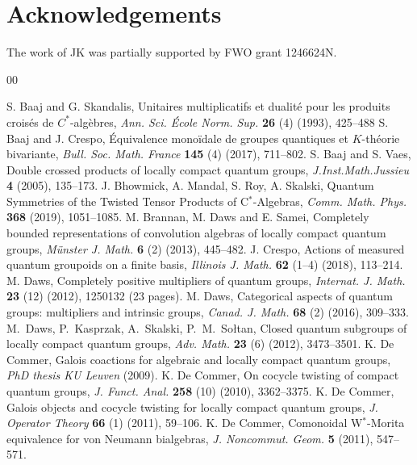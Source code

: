 \documentclass[reqno]{amsart}
\numberwithin{equation}{section}
\begin{document}
\section{Acknowledgements}
The work of JK was partially supported by FWO grant 1246624N.

\begin{thebibliography}{00}

 S. Baaj and G. Skandalis, Unitaires multiplicatifs et dualit\'e{} pour les produits
              crois\'es de {$C^*$}-alg\`ebres, \emph{Ann. Sci. \'Ecole Norm. Sup.} \textbf{26} (4) (1993), 425--488
 S. Baaj and J. Crespo, \'{E}quivalence mono\"{i}dale de groupes quantiques et $K$-théorie bivariante, \emph{Bull. Soc. Math. France} \textbf{145} (4) (2017), 711--802.
 S. Baaj and S. Vaes, Double crossed products of locally compact quantum groups, \emph{J.Inst.Math.Jussieu} \textbf{4} (2005), 135--173.
 J. Bhowmick, A. Mandal, S. Roy, A. Skalski, Quantum Symmetries of the Twisted Tensor Products of C$^*$-Algebras, \emph{Comm. Math. Phys.} \textbf{368} (2019), 1051--1085.
 M. Brannan, M. Daws and E. Samei, Completely bounded representations of convolution algebras of locally compact quantum groups, \emph{M{\"u}nster J. Math.} \textbf{6} (2) (2013), 445--482.
 J. Crespo, Actions of measured quantum groupoids on a finite basis, \emph{Illinois J. Math.} \textbf{62} (1--4) (2018),  113--214.
 M. Daws, Completely positive multipliers of quantum groups, \emph{Internat. J. Math.} \textbf{23} (12) (2012), 1250132 (23 pages).
 M. Daws, Categorical aspects of quantum groups: multipliers and intrinsic groups, \emph{Canad. J. Math.} \textbf{68} (2) (2016), 309--333.
 M.\ Daws, P.\ Kasprzak, A.\ Skalski, P.\ M.\ So\l tan, Closed quantum subgroups of locally compact quantum groups, \emph{Adv. Math.} \textbf{23} (6) (2012),  3473--3501.
 K. De Commer, Galois coactions for algebraic and locally compact quantum groups, \emph{PhD thesis KU Leuven} (2009).
 K. De Commer, On cocycle twisting of compact quantum groups, \emph{J. Funct. Anal.} \textbf{258} (10) (2010), 3362--3375.
 K. De Commer, Galois objects and cocycle twisting for locally compact quantum groups, \emph{J. Operator Theory} \textbf{66} (1) (2011), 59--106.
 K. De Commer, Comonoidal W$^*$-Morita equivalence for von Neumann bialgebras, \emph{J. Noncommut. Geom.} \textbf{5} (2011), 547–571.

\end{thebibliography}
\end{document}
